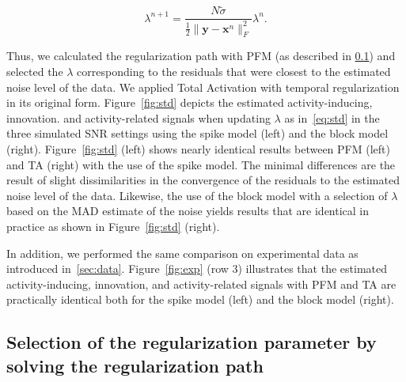 \begin{equation}
    \lambda^{n+1} = \frac{N \tilde{\sigma}}{\frac{1}{2} \| \mathbf{y} - \mathbf{x}^n \|_F^2} \lambda^n.
\label{eq:std}
\end{equation}

Thus, we calculated the regularization path with PFM (as described in \ref{sec:regpath}) and selected the \(\lambda\) corresponding to the residuals that were closest to the estimated noise level of the data. We applied Total Activation with temporal regularization in its original form. Figure~\ref{fig:std} depicts the estimated activity-inducing, innovation. and activity-related signals when updating \(\lambda\) as in~\eqref{eq:std} in the three simulated SNR settings using the spike model (left) and the block model (right). Figure~\ref{fig:std} (left) shows nearly identical results between PFM (left) and TA (right) with the use of the spike model. The minimal differences are the result of slight dissimilarities in the convergence of the residuals to the estimated noise level of the data. Likewise, the use of the block model with a selection of \(\lambda\) based on the MAD estimate of the noise yields results that are identical in practice as shown in Figure~\ref{fig:std} (right).

In addition, we performed the same comparison on experimental data as introduced in~\ref{sec:data}. Figure~\ref{fig:exp} (row 3) illustrates that the estimated activity-inducing, innovation, and activity-related signals with PFM and TA are practically identical both for the spike model (left) and the block model (right).

\subsection{Selection of the regularization parameter by solving the regularization path}
\label{sec:regpath}


